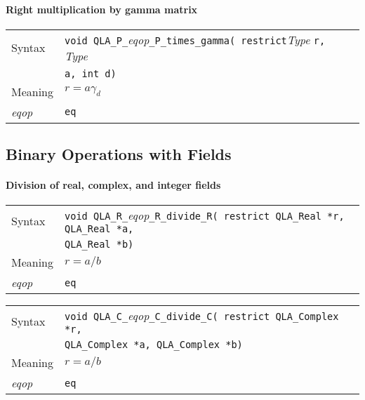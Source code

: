 \documentclass{article}
\newcommand{\tReal}{QLA\ttdash Real }
\newcommand{\tComplex}{QLA\ttdash Complex }
\newcommand{\namespace}{QLA}
\newcommand{\ttdash}{{\tt \_}}
\newcommand{\extraarg}{}
\begin{document}
\paragraph{Right multiplication by gamma matrix}
\begin{flushleft}
  \begin{tabular}{|l|l|}
  \hline
  Syntax      & {\tt void \namespace}\ttdash{\tt P}\ttdash{\it eqop}\ttdash{\tt P}\ttdash{\tt times}\ttdash{\tt gamma( restrict}{\it Type }{\tt *r, }{\it Type }\\
              & {\tt *a, int d\extraarg)} \\
  \hline
  Meaning     & $r = a \gamma_d$ \\
  \hline
  {\it eqop}  & {\tt eq} \\
  \hline
  \end{tabular}
\end{flushleft}

\subsection{Binary Operations with Fields}

\paragraph{Division of real, complex, and integer fields}

\begin{flushleft}
  \begin{tabular}{|l|l|}
  \hline
  Syntax      & {\tt void \namespace}\ttdash{\tt R}\ttdash{\it eqop}\ttdash{\tt R}\ttdash{\tt divide}\ttdash{\tt R}{\tt ( restrict \tReal *r, \tReal *a, }\\
              & {\tt \tReal *b\extraarg)} \\
  \hline
  Meaning     & $r = a/b$ \\
  \hline
  {\it eqop}  & {\tt eq} \\
  \hline
  \end{tabular}
\end{flushleft}

\begin{flushleft}
  \begin{tabular}{|l|l|}
  \hline
  Syntax      & {\tt void \namespace}\ttdash{\tt C}\ttdash{\it eqop}\ttdash{\tt C}\ttdash{\tt divide}\ttdash{\tt C}{\tt ( restrict \tComplex *r,}\\
              & {\tt  \tComplex *a, \tComplex *b\extraarg)} \\
  \hline
  Meaning     & $r = a/b$ \\
  \hline
  {\it eqop}  & {\tt eq} \\
  \hline
  \end{tabular}
\end{flushleft}
\end{document}
